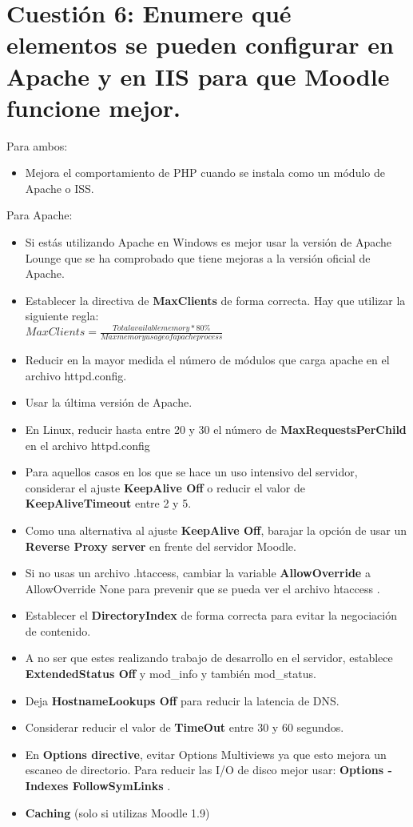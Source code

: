 
\section{Cuestión 6: Enumere qué elementos se pueden configurar en Apache y en IIS para que Moodle funcione mejor.}

Para ambos: 
\begin{itemize}
	\item Mejora el comportamiento de PHP cuando se instala como un módulo de Apache o ISS.
\end{itemize}

Para Apache:
\begin{itemize}
	\item Si estás utilizando Apache en Windows es mejor usar la versión de Apache Lounge que se ha comprobado que tiene mejoras a la versión oficial de Apache.
	\item Establecer la directiva de \textbf{MaxClients} de forma correcta. Hay que utilizar la siguiente regla:\\
	$MaxClients = \frac{Total available memory * 80\%}{Max memory usage of apache process}$
	\item Reducir en la mayor medida el número de módulos que carga apache en el archivo httpd.config.
	\item Usar la última versión de Apache.
	\item En Linux, reducir hasta entre 20 y 30 el número de \textbf{MaxRequestsPerChild} en el archivo httpd.config
	\item Para aquellos casos en los que se hace un uso intensivo del servidor, considerar el ajuste \textbf{KeepAlive Off} o reducir el valor de \textbf{KeepAliveTimeout} entre 2 y 5.
	\item Como una alternativa al ajuste \textbf{KeepAlive Off}, barajar la opción de usar un \textbf{Reverse Proxy server} en frente del servidor Moodle.
	\item Si no usas un archivo .htaccess, cambiar la variable  \textbf{AllowOverride} a AllowOverride None para prevenir que se pueda ver el archivo htaccess .
	\item Establecer el \textbf{DirectoryIndex} de forma correcta para evitar la negociación de contenido.
	\item A no ser que estes realizando trabajo de desarrollo en el servidor, establece \textbf{ExtendedStatus Off} y  mod\_info y también mod\_status.
	\item Deja \textbf{HostnameLookups Off } para reducir la latencia de DNS.
	\item Considerar reducir el  valor de \textbf{TimeOut} entre 30 y 60 segundos.
	\item En \textbf{Options directive}, evitar Options Multiviews ya que esto mejora un escaneo de directorio. Para reducir las I/O de disco mejor usar: \textbf{Options -Indexes FollowSymLinks} .
	\item \textbf{Caching} (solo si utilizas Moodle 1.9) 
\end{itemize}

